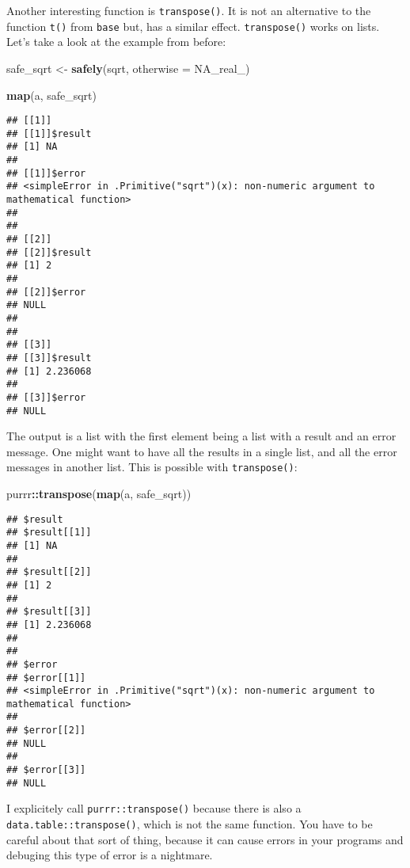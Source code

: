 \documentclass[
]{article}
\newenvironment{Shaded}{\begin{snugshade}}{\end{snugshade}}
\newcommand{\DataTypeTok}[1]{\textcolor[rgb]{0.13,0.29,0.53}{#1}}
\newcommand{\KeywordTok}[1]{\textcolor[rgb]{0.13,0.29,0.53}{\textbf{#1}}}
\newcommand{\NormalTok}[1]{#1}
\newcommand{\OperatorTok}[1]{\textcolor[rgb]{0.81,0.36,0.00}{\textbf{#1}}}
\newcommand{\OtherTok}[1]{\textcolor[rgb]{0.56,0.35,0.01}{#1}}
\newcommand{\StringTok}[1]{\textcolor[rgb]{0.31,0.60,0.02}{#1}}
\begin{document}
Another interesting function is \texttt{transpose()}. It is not an alternative to the function \texttt{t()} from
\texttt{base} but, has a similar effect. \texttt{transpose()} works on lists. Let's take a look at the example
from before:

\begin{Shaded}
\begin{Highlighting}[]
\NormalTok{safe\_sqrt \textless{}{-}}\StringTok{ }\KeywordTok{safely}\NormalTok{(sqrt, }\DataTypeTok{otherwise =} \OtherTok{NA\_real\_}\NormalTok{)}

\KeywordTok{map}\NormalTok{(a, safe\_sqrt)}
\end{Highlighting}
\end{Shaded}

\begin{verbatim}
## [[1]]
## [[1]]$result
## [1] NA
## 
## [[1]]$error
## <simpleError in .Primitive("sqrt")(x): non-numeric argument to mathematical function>
## 
## 
## [[2]]
## [[2]]$result
## [1] 2
## 
## [[2]]$error
## NULL
## 
## 
## [[3]]
## [[3]]$result
## [1] 2.236068
## 
## [[3]]$error
## NULL
\end{verbatim}

The output is a list with the first element being a list with a result and an error message. One
might want to have all the results in a single list, and all the error messages in another list.
This is possible with \texttt{transpose()}:

\begin{Shaded}
\begin{Highlighting}[]
\NormalTok{purrr}\OperatorTok{::}\KeywordTok{transpose}\NormalTok{(}\KeywordTok{map}\NormalTok{(a, safe\_sqrt))}
\end{Highlighting}
\end{Shaded}

\begin{verbatim}
## $result
## $result[[1]]
## [1] NA
## 
## $result[[2]]
## [1] 2
## 
## $result[[3]]
## [1] 2.236068
## 
## 
## $error
## $error[[1]]
## <simpleError in .Primitive("sqrt")(x): non-numeric argument to mathematical function>
## 
## $error[[2]]
## NULL
## 
## $error[[3]]
## NULL
\end{verbatim}

I explicitely call \texttt{purrr::transpose()} because there is also a \texttt{data.table::transpose()}, which
is not the same function. You have to be careful about that sort of thing, because it can cause
errors in your programs and debuging this type of error is a nightmare.
\end{document}
